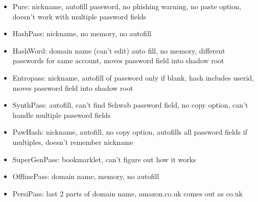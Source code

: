 \begin{itemize}
\item Pure: nickname, autofill password, no phishing warning, no paste option, doesn't work with multiple password fields


\item HashPass: nickname, no memory, no autofill


\item HashWord: domain name (can't edit) auto fill, no memory, different passwords for same account, moves password field into shadow root


\item Entropass: nickname, autofill of password only if blank, hash includes userid, moves password field into shadow root


\item SynthPass: autofill, can't find Schwab password field, no copy option, can't handle multiple password fields


\item PawHash: nickname, autofill, no copy option, autofills all password fields if multiples, doesn't remember nickname


\item SuperGenPass: bookmarklet, can't figure out how it works


\item OfflinePass: domain name, memory, no autofill


\item 
PersiPass: last 2 parts of domain name, amazon.co.uk comes out as co.uk


\end{itemize}
